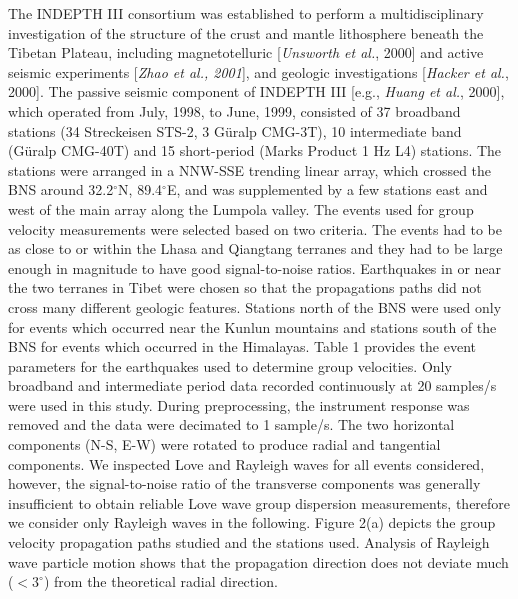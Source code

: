\documentclass[12pt]{article}
\begin{document}
The INDEPTH III consortium was established to perform a multidisciplinary investigation of the structure of
the crust and mantle lithosphere beneath the Tibetan Plateau,
including magnetotelluric [{\it Unsworth et al.}, 2000] and active
seismic experiments [{\it Zhao et al., 2001}], and geologic
investigations [{\it Hacker et al.}, 2000].
The passive seismic component of INDEPTH III [e.g., {\it Huang
et al.}, 2000],
which operated from July, 1998, to June, 1999, consisted of 37 broadband
stations (34 Streckeisen STS-2, 3 G\"uralp
CMG-3T), 10 intermediate band (G\"uralp CMG-40T) and 15 short-period (Marks Product 1 Hz L4) stations.  The
stations were arranged in a NNW-SSE trending linear array, which crossed the BNS around 32.2$^\circ$N,
89.4$^\circ$E, and was supplemented by a few stations east and west of the main array along the Lumpola
valley.   The events used for group velocity measurements were selected based on two criteria.  The events had to be as close
to or within the Lhasa and Qiangtang terranes and they had to be large enough in magnitude to have good
signal-to-noise ratios. Earthquakes in or near the two terranes in Tibet were chosen so that the
propagations paths did not cross many different geologic features. Stations north of the BNS were used only
for events which occurred near the Kunlun mountains and stations south of the BNS for events which occurred
in the Himalayas.   Table 1 provides the event parameters for the earthquakes used to determine group
velocities.  Only broadband and intermediate period data recorded continuously at 20 samples/s were used in
this study.  During preprocessing, the instrument response was removed and the data were decimated to 1
sample/s.  The two horizontal components (N-S, E-W) were rotated to produce radial and tangential
components.
We inspected Love and Rayleigh waves for all events considered,
however, the signal-to-noise ratio of the transverse components was generally insufficient
to obtain reliable Love wave group dispersion measurements, therefore we consider only Rayleigh
waves in the following.
Figure 2(a) depicts the group velocity propagation paths studied and the stations used.
Analysis of Rayleigh wave particle motion shows that the propagation direction does not deviate much
($<3^\circ$) from the theoretical radial direction.
\end{document}
